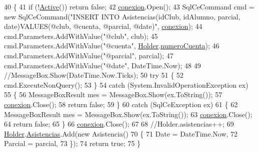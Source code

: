 \begin{DoxyCode}
40         \{
41             \textcolor{keywordflow}{if} (!\hyperlink{class_asistencias__wpf_1_1_asistente_d_b_manager_ae48d582f5f9db4788e0f5f7c1bfe9b6e}{Active}()) \textcolor{keywordflow}{return} \textcolor{keyword}{false};
42             \hyperlink{class_asistencias__wpf_1_1_asistente_d_b_manager_a4ed268d53c358adfb5ca0185439bd6cf}{conexion}.Open();
43             SqlCeCommand cmd = \textcolor{keyword}{new} SqlCeCommand(\textcolor{stringliteral}{"INSERT INTO Asistencias(idClub, idAlumno, parcial,
       date)VALUES(@club, @cuenta, @parcial, @date)"}, \hyperlink{class_asistencias__wpf_1_1_asistente_d_b_manager_a4ed268d53c358adfb5ca0185439bd6cf}{conexion});
44             cmd.Parameters.AddWithValue(\textcolor{stringliteral}{"@club"}, club);
45             cmd.Parameters.AddWithValue(\textcolor{stringliteral}{"@cuenta"}, \hyperlink{class_asistencias__wpf_1_1_asistente_d_b_manager_a4f73db2d92f913ccc8862126717968cd}{Holder}.\hyperlink{class_asistencias__wpf_1_1_asistente_a6d2aa009497445d62699e3c9d402ca78}{numeroCuenta});
46             cmd.Parameters.AddWithValue(\textcolor{stringliteral}{"@parcial"}, parcial);
47             cmd.Parameters.AddWithValue(\textcolor{stringliteral}{"@date"}, DateTime.Now);
48 
49             \textcolor{comment}{//MessageBox.Show(DateTime.Now.Ticks);}
50             \textcolor{keywordflow}{try}
51             \{
52                 cmd.ExecuteNonQuery();
53             \}
54             \textcolor{keywordflow}{catch} (System.InvalidOperationException ex)
55             \{
56                 MessageBoxResult mes = MessageBox.Show(ex.ToString());
57                 \hyperlink{class_asistencias__wpf_1_1_asistente_d_b_manager_a4ed268d53c358adfb5ca0185439bd6cf}{conexion}.Close();
58                 \textcolor{keywordflow}{return} \textcolor{keyword}{false};
59             \}
60             \textcolor{keywordflow}{catch} (SqlCeException ex)
61             \{
62                 MessageBoxResult mes = MessageBox.Show(ex.ToString());
63                 \hyperlink{class_asistencias__wpf_1_1_asistente_d_b_manager_a4ed268d53c358adfb5ca0185439bd6cf}{conexion}.Close();
64                 \textcolor{keywordflow}{return} \textcolor{keyword}{false};
65             \}
66             \hyperlink{class_asistencias__wpf_1_1_asistente_d_b_manager_a4ed268d53c358adfb5ca0185439bd6cf}{conexion}.Close();
67 
68             \textcolor{comment}{//Holder.asistencias++;}
69             \hyperlink{class_asistencias__wpf_1_1_asistente_d_b_manager_a4f73db2d92f913ccc8862126717968cd}{Holder}.\hyperlink{class_asistencias__wpf_1_1_asistente_a7f5283d025ade6827ef7504f111bc1c7}{Asistencias}.Add(\textcolor{keyword}{new} Asistencia()
70             \{
71                 Date = DateTime.Now,
72                 Parcial = parcial,
73             \});
74             \textcolor{keywordflow}{return} \textcolor{keyword}{true};
75         \}
\end{DoxyCode}
